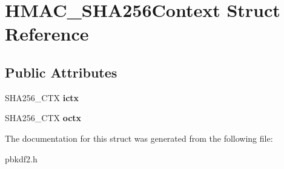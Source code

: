 \hypertarget{struct_h_m_a_c___s_h_a256_context}{}\section{H\+M\+A\+C\+\_\+\+S\+H\+A256\+Context Struct Reference}
\label{struct_h_m_a_c___s_h_a256_context}
\subsection*{Public Attributes}
\begin{DoxyCompactItemize}
\item 
\mbox{\label{struct_h_m_a_c___s_h_a256_context_a3433296fae8500c793388994de730f3c}} 
S\+H\+A256\+\_\+\+C\+TX {\bfseries ictx}
\item 
\mbox{\label{struct_h_m_a_c___s_h_a256_context_a699abe00837406f312a95226741137f4}} 
S\+H\+A256\+\_\+\+C\+TX {\bfseries octx}
\end{DoxyCompactItemize}


The documentation for this struct was generated from the following file\+:\begin{DoxyCompactItemize}
\item 
pbkdf2.\+h\end{DoxyCompactItemize}
